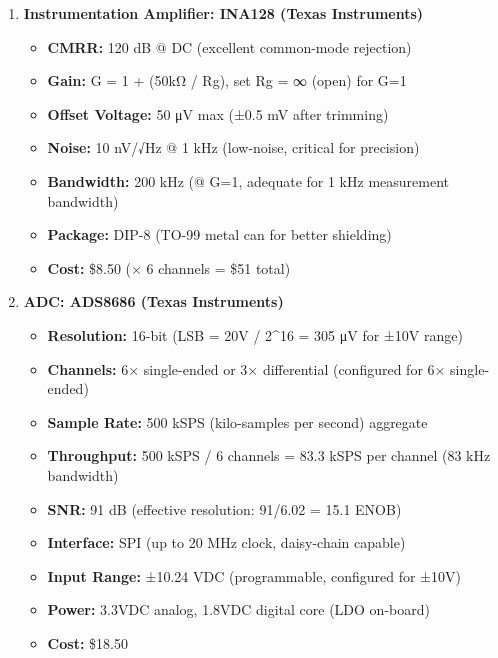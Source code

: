 \documentclass[
]{article}
\providecommand{\tightlist}{%
  \setlength{\itemsep}{0pt}\setlength{\parskip}{0pt}}
\begin{document}
\begin{enumerate}
\def\labelenumi{\arabic{enumi}.}
\tightlist
\item
  \textbf{Instrumentation Amplifier: INA128 (Texas Instruments)}

  \begin{itemize}
  \tightlist
  \item
    \textbf{CMRR:} 120 dB @ DC (excellent common-mode rejection)
  \item
    \textbf{Gain:} G = 1 + (50kΩ / Rg), set Rg = ∞ (open) for G=1
  \item
    \textbf{Offset Voltage:} 50 μV max (±0.5 mV after trimming)
  \item
    \textbf{Noise:} 10 nV/√Hz @ 1 kHz (low-noise, critical for
    precision)
  \item
    \textbf{Bandwidth:} 200 kHz (@ G=1, adequate for 1 kHz measurement
    bandwidth)
  \item
    \textbf{Package:} DIP-8 (TO-99 metal can for better shielding)
  \item
    \textbf{Cost:} \$8.50 (× 6 channels = \$51 total)
  \end{itemize}
\item
  \textbf{ADC: ADS8686 (Texas Instruments)}

  \begin{itemize}
  \tightlist
  \item
    \textbf{Resolution:} 16-bit (LSB = 20V / 2\^{}16 = 305 μV for ±10V
    range)
  \item
    \textbf{Channels:} 6× single-ended or 3× differential (configured
    for 6× single-ended)
  \item
    \textbf{Sample Rate:} 500 kSPS (kilo-samples per second) aggregate
  \item
    \textbf{Throughput:} 500 kSPS / 6 channels = 83.3 kSPS per channel
    (83 kHz bandwidth)
  \item
    \textbf{SNR:} 91 dB (effective resolution: 91/6.02 = 15.1 ENOB)
  \item
    \textbf{Interface:} SPI (up to 20 MHz clock, daisy-chain capable)
  \item
    \textbf{Input Range:} ±10.24 VDC (programmable, configured for ±10V)
  \item
    \textbf{Power:} 3.3VDC analog, 1.8VDC digital core (LDO on-board)
  \item
    \textbf{Cost:} \$18.50
  \end{itemize}
\end{enumerate}
\end{document}
